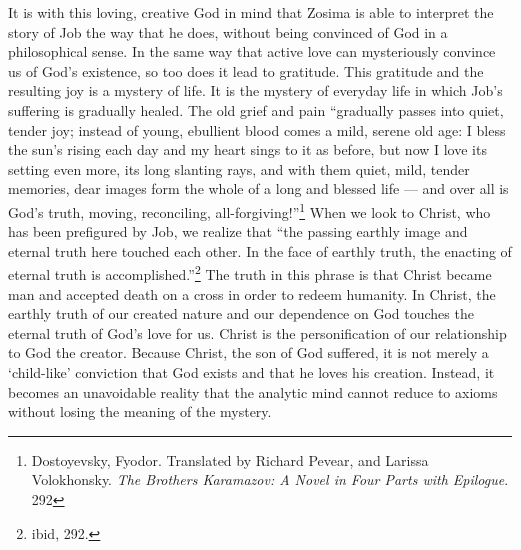 It is with this loving, creative God in mind that Zosima is able to interpret the story of Job the way that  he does, without being convinced of God in a philosophical sense. In the same way that active love can mysteriously convince us of God's existence, so too does it lead to gratitude. This gratitude and the resulting joy is a mystery of life.  It is the mystery of everyday life in which Job's suffering is gradually healed. The old grief and pain ``gradually passes into quiet, tender joy; instead of young, ebullient blood comes a mild, serene old age: I bless the sun's rising each day and my heart sings to it as before, but now I love its setting even more, its long slanting rays, and with them quiet, mild, tender memories, dear images form the whole of a long and blessed life --- and over all is God's truth, moving, reconciling, all-forgiving!''\footnote{Dostoyevsky, Fyodor. Translated by Richard Pevear, and Larissa Volokhonsky. \emph{The Brothers Karamazov: A Novel in Four Parts with Epilogue}. 292} When we look to Christ, who has been prefigured by Job, we realize that ``the passing earthly image and eternal truth here touched each other. In the face of earthly truth, the enacting of eternal truth is accomplished.''\footnote{ibid, 292.}  The truth in this phrase is that Christ became man and accepted death on a cross in order to redeem humanity.  In Christ, the earthly truth of our created nature and our dependence on God touches the eternal truth of God's love for us.  Christ is the personification of our relationship to God the creator.  Because Christ, the son of God suffered, it is not merely a `child-like' conviction that God exists and that he loves his creation. Instead, it becomes an unavoidable reality that the analytic mind cannot reduce to axioms without losing the meaning of the mystery. 

